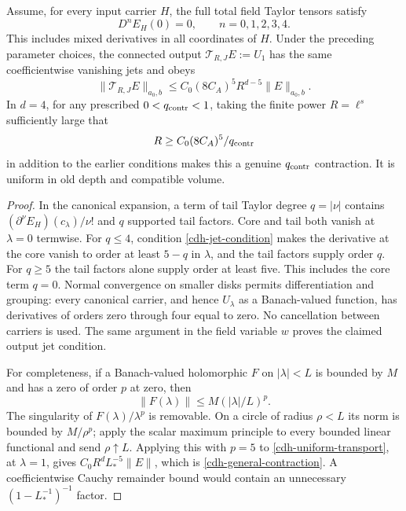 \begin{theorem}
\label{cdh-contraction}
Assume, for every input carrier $H$, the full total field
Taylor tensors satisfy
\begin{equation}
 D^nE_H(0)=0,\qquad n=0,1,2,3,4.
 \label{cdh-jet-condition}
\end{equation}
This includes mixed derivatives in all coordinates of $H$.
Under the preceding parameter choices, the connected output
$\mathcal T_{R,J}E:=U_1$ has the same coefficientwise vanishing
jets and obeys
\begin{equation}
 \|\mathcal T_{R,J}E\|_{a_0,b}
 \leq C_0(8C_A)^5R^{d-5}\|E\|_{a_0,b}.
 \label{cdh-general-contraction}
\end{equation}
In $d=4$, for any prescribed $0<q_{\rm contr}<1$, taking the
finite power $R=\ell^s$ sufficiently large that
\begin{equation}
 R\geq C_0(8C_A)^5/q_{\rm contr}
 \label{cdh-R-contraction}
\end{equation}
in addition to the earlier conditions makes this a genuine
$q_{\rm contr}$ contraction. It is uniform in old depth and
compatible volume.
\end{theorem}

\begin{proof}
In the canonical expansion, a term of tail Taylor degree
$q=|\nu|$ contains
$(\partial^\nu E_H)(c_\lambda)/\nu!$ and $q$ supported tail
factors. Core and tail both vanish at $\lambda=0$ termwise.
For $q\leq4$, condition \eqref{cdh-jet-condition} makes the
derivative at the core vanish to order at least $5-q$ in
$\lambda$, and the tail factors supply order $q$.
For $q\geq5$ the tail factors alone supply order at least five.
This includes the core term $q=0$.
Normal convergence on smaller disks permits differentiation
and grouping: every canonical carrier, and hence $U_\lambda$
as a Banach-valued function, has derivatives of orders zero
through four equal to zero. No cancellation between carriers
is used. The same argument in the field variable $w$ proves
the claimed output jet condition.

For completeness, if a Banach-valued holomorphic $F$ on
$|\lambda|<L$ is bounded by $M$ and has a zero of order $p$ at
zero, then
\begin{equation}
 \|F(\lambda)\|\leq M(|\lambda|/L)^p.
 \label{cdh-Banach-Schwarz}
\end{equation}
The singularity of $F(\lambda)/\lambda^p$ is removable.
On a circle of radius $\rho<L$ its norm is bounded by
$M/\rho^p$; apply the scalar maximum principle to every
bounded linear functional and send $\rho\uparrow L$.
Applying this with $p=5$ to
\eqref{cdh-uniform-transport}, at $\lambda=1$, gives
$C_0R^dL_*^{-5}\|E\|$, which is
\eqref{cdh-general-contraction}. A coefficientwise Cauchy
remainder bound would contain an unnecessary
$(1-L_*^{-1})^{-1}$ factor.
\end{proof}

